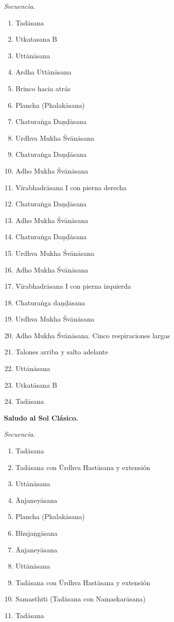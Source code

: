 \emph{Secuencia.}
\begin{enumerate}
\item Tadāsana
\item Utkatasana B
\item Uttānāsana
\item Ardha Uttānāsana
\item Brinco hacia atrás
\item Plancha (Phalakāsana)
\item Chaturaṅga Daṇḍāsana
\item Urdhva Mukha Śvānāsana
\item Chaturaṅga Daṇḍāsana
\item Adho Mukha Śvānāsana
\item Vīrabhadrāsana I con pierna derecha
\item Chaturaṅga Daṇḍāsana
\item Adho Mukha Śvānāsana
\item Chaturaṅga Daṇḍāsana
\item Urdhva Mukha Śvānāsana
\item Adho Mukha Śvānāsana
\item Vīrabhadrāsana I con pierna izquierda
\item Chaturaṅga daṇḍāsana
\item Urdhva Mukha Śvānāsana
\item Adho Mukha Śvānāsana. Cinco
respiraciones largas
\item Talones arriba y salto adelante
\item Uttānāsana
\item Utkatāsana B
\item Tadāsana
\end{enumerate}

\medskip\noindent\textbf{Saludo al Sol
Clásico.}

\emph{Secuencia.}
\begin{enumerate}
\item Tadāsana
\item Tadāsana con Ūrdhva Hastāsana y
extensión
\item Uttānāsana
\item Ānjaneyāsana
\item Plancha (Phalakāsana)
\item Bhujaṇgāsana
\item Ānjaneyāsana
\item Uttānāsana
\item Tadāsana con Ūrdhva Hastāsana y
extensión
\item Samasthiti (Tadāsana con Namaskarāsana)
\item Tadāsana
\end{enumerate}


